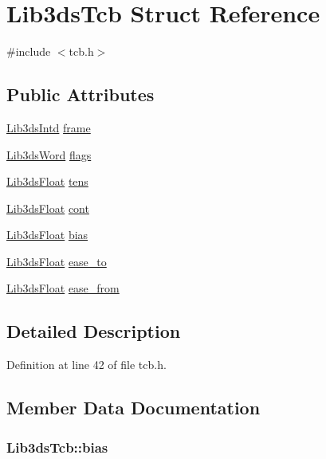 \hypertarget{struct_lib3ds_tcb}{\section{Lib3ds\-Tcb Struct Reference}
\label{struct_lib3ds_tcb}
}


{\ttfamily \#include $<$tcb.\-h$>$}

\subsection*{Public Attributes}
\begin{DoxyCompactItemize}
\item 
\hyperlink{types_8h_a5d92ad41149cf040ce2ee32cc2609403}{Lib3ds\-Intd} \hyperlink{struct_lib3ds_tcb_afd648d742147731b61eba30f9b02a38d}{frame}
\item 
\hyperlink{types_8h_a439f68d12f4ad080599044949e41dba1}{Lib3ds\-Word} \hyperlink{struct_lib3ds_tcb_a4adeca59e90f5f72a140280f7b9589f3}{flags}
\item 
\hyperlink{types_8h_ab18e70f51f9a53c9dee8d930c8e1a7bf}{Lib3ds\-Float} \hyperlink{struct_lib3ds_tcb_af968af82a719cb2d6bb744b536c4e332}{tens}
\item 
\hyperlink{types_8h_ab18e70f51f9a53c9dee8d930c8e1a7bf}{Lib3ds\-Float} \hyperlink{struct_lib3ds_tcb_a6ebd4ac03accfb09f2a0ed6673c280f1}{cont}
\item 
\hyperlink{types_8h_ab18e70f51f9a53c9dee8d930c8e1a7bf}{Lib3ds\-Float} \hyperlink{struct_lib3ds_tcb_ae832779c62eee47cd43389506816451b}{bias}
\item 
\hyperlink{types_8h_ab18e70f51f9a53c9dee8d930c8e1a7bf}{Lib3ds\-Float} \hyperlink{struct_lib3ds_tcb_a94b7c49d6e09e954fe96a6f237378695}{ease\-\_\-to}
\item 
\hyperlink{types_8h_ab18e70f51f9a53c9dee8d930c8e1a7bf}{Lib3ds\-Float} \hyperlink{struct_lib3ds_tcb_abcad2e9f7ee669f4201319868eabc8cd}{ease\-\_\-from}
\end{DoxyCompactItemize}


\subsection{Detailed Description}


Definition at line 42 of file tcb.\-h.



\subsection{Member Data Documentation}
\hypertarget{struct_lib3ds_tcb_ae832779c62eee47cd43389506816451b}{
\subsubsection[{bias}]{ Lib3ds\-Tcb\-::bias}}\label{struct_lib3ds_tcb_ae832779c62eee47cd43389506816451b}


